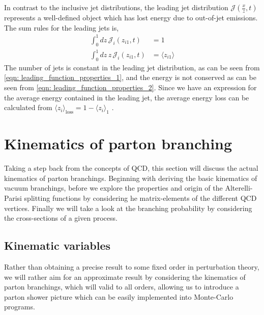 \documentclass[main.tex]{subfiles}
\begin{document}
In contrast to the inclusive jet distributions, the leading jet distribution \(\mathcal{J}(\frac{x}{z},t)\) represents a well-defined object which has lost energy due to out-of-jet emissions. The  sum rules for the leading jets is,
\begin{align}
    \int_0^1 dz\, \mathcal{J}_i(z_{i1},t) &= 1 \label{eqn: leading_function_properties_1}\\
    \int_0^1 dz\, z\,  \mathcal{J}_i(z_{i1},t) &= \langle z_{i1}\rangle  \label{eqn: leading_function_properties_2}
\end{align}
The number of jets is constant in the leading jet distribution, as can be seen from \autoref{eqn: leading_function_properties_1}, and the energy is not conserved as can be seen from \autoref{eqn: leading_function_properties_2}. Since we have an expression for the average energy contained in the leading jet, the average energy loss can be calculated from \(\langle z_{i} \rangle_\text{loss} = 1 -\langle z_{i}\rangle_1 \) \cite{Neill_2021}. 

\section{Kinematics of parton branching}
Taking a step back from the concepts of QCD, this section will discuss the actual kinematics of parton branchings. Beginning with deriving the basic kinematics of vacuum branchings, before we explore the properties and origin of the Alterelli-Parisi splitting functions by considering he matrix-elements of the different QCD vertices. Finally we will take a look at the branching probability by considering the cross-sections of a given process.


\subsection{Kinematic variables}
Rather than obtaining a precise result to some fixed order in perturbation theory, we will rather aim for an approximate result by considering the kinematics of parton branchings, which will valid to all orders, allowing us to introduce a parton shower picture which can be easily implemented into Monte-Carlo programs.
\end{document}
